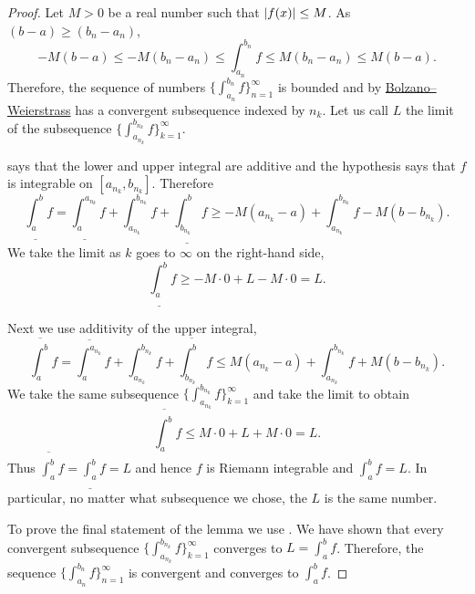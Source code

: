 \begin{proof}
Let $M > 0$ be a real number such that $\left\lvert {f(x)} \right\rvert \leq M$.
As $(b-a) \geq (b_n-a_n)$,
\begin{equation*}
-M(b-a) \leq
-M(b_n-a_n) \leq
\int_{a_n}^{b_n} f
\leq
M(b_n-a_n) \leq
M(b-a) .
\end{equation*}
Therefore, the sequence of numbers
$\bigl\{ \int_{a_n}^{b_n} f \bigr\}_{n=1}^\infty$ is bounded and by
\hyperref[thm:bwseq]{Bolzano--Weierstrass}
has a convergent subsequence indexed by $n_k$.  Let us call
$L$ the limit of the subsequence
$\bigl\{ \int_{a_{n_k}}^{b_{n_k}} f \bigr\}_{k=1}^\infty$.

 says that
the lower and upper integral are additive
and the hypothesis says that
$f$ is integrable on $[a_{n_k},b_{n_k}]$.
Therefore
\begin{equation*}
\underline{\int_a^b} f
=
\underline{\int_a^{a_{n_k}}} f
+
\int_{a_{n_k}}^{b_{n_k}} f
+
\underline{\int_{b_{n_k}}^b} f
\geq
-M(a_{n_k}-a)
+
\int_{a_{n_k}}^{b_{n_k}} f
-
M(b-b_{n_k}) .
\end{equation*}
We take the limit as $k$ goes to $\infty$ on the right-hand side,
\begin{equation*}
\underline{\int_a^b} f
\geq
-M\cdot 0
+
L
-
M\cdot 0
= L .
\end{equation*}

Next we use additivity of the upper integral,
\begin{equation*}
\overline{\int_a^b} f
=
\overline{\int_a^{a_{n_k}}} f
+
\int_{a_{n_k}}^{b_{n_k}} f
+
\overline{\int_{b_{n_k}}^b} f
\leq
M(a_{n_k}-a)
+
\int_{a_{n_k}}^{b_{n_k}} f
+
M(b-b_{n_k}) .
\end{equation*}
We take the same subsequence 
$\{ \int_{a_{n_k}}^{b_{n_k}} f \}_{k=1}^\infty$ and take the limit 
to obtain
\begin{equation*}
\overline{\int_a^b} f
\leq
M\cdot 0
+
L
+
M\cdot 0
= L .
\end{equation*}
Thus $\overline{\int_a^b} f = \underline{\int_a^b} f = L$
and hence $f$ is Riemann integrable and $\int_a^b f = L$.
In particular, no matter what
subsequence we chose,
the $L$ is the same number.

To prove the final statement of the lemma we use 
.  We have shown that every convergent
subsequence
$\bigl\{ \int_{a_{n_k}}^{b_{n_k}} f \bigr\}_{k=1}^\infty$ converges to $L = \int_a^b f$.
Therefore, the sequence
$\bigl\{ \int_{a_n}^{b_n} f \bigr\}_{n=1}^\infty$ is convergent and converges to $\int_a^b f$.
\end{proof}

